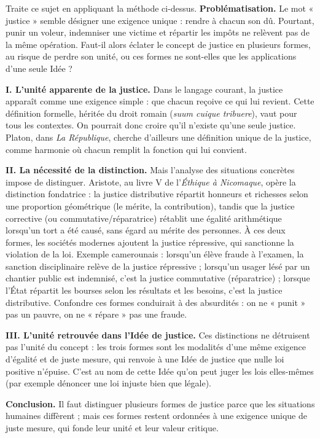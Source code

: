 \documentclass[11pt]{article}
\newcommand{\cle}[1]{{\popxbold\color{popdark}#1}}
\begin{document}
\begin{exoresolu}
Traite ce sujet en appliquant la méthode ci-dessus.
\tcblower
\textbf{Problématisation.} Le mot « justice » semble désigner une exigence unique : rendre à chacun son dû. Pourtant, punir un voleur, indemniser une victime et répartir les impôts ne relèvent pas de la même opération. Faut-il alors éclater le concept de justice en plusieurs formes, au risque de perdre son unité, ou ces formes ne sont-elles que les applications d'une seule Idée ?

\textbf{I. L'unité apparente de la justice.} Dans le langage courant, la justice apparaît comme une exigence simple : que chacun reçoive ce qui lui revient. Cette définition formelle, héritée du droit romain (\emph{suum cuique tribuere}), vaut pour tous les contextes. On pourrait donc croire qu'il n'existe qu'une seule justice. Platon, dans \emph{La République}, cherche d'ailleurs une définition unique de la justice, comme harmonie où chacun remplit la fonction qui lui convient.

\textbf{II. La nécessité de la distinction.} Mais l'analyse des situations concrètes impose de distinguer. Aristote, au livre V de l'\emph{Éthique à Nicomaque}, opère la distinction fondatrice : la \cle{justice distributive} répartit honneurs et richesses selon une proportion géométrique (le mérite, la contribution), tandis que la \cle{justice corrective} (ou commutative/réparatrice) rétablit une égalité arithmétique lorsqu'un tort a été causé, sans égard au mérite des personnes. À ces deux formes, les sociétés modernes ajoutent la \cle{justice répressive}, qui sanctionne la violation de la loi. Exemple camerounais : lorsqu'un élève fraude à l'examen, la sanction disciplinaire relève de la justice répressive ; lorsqu'un usager lésé par un chantier public est indemnisé, c'est la justice commutative (réparatrice) ; lorsque l'État répartit les bourses selon les résultats et les besoins, c'est la justice distributive. Confondre ces formes conduirait à des absurdités : on ne « punit » pas un pauvre, on ne « répare » pas une fraude.

\textbf{III. L'unité retrouvée dans l'Idée de justice.} Ces distinctions ne détruisent pas l'unité du concept : les trois formes sont les modalités d'une même exigence d'égalité et de juste mesure, qui renvoie à une \cle{Idée de justice} que nulle loi positive n'épuise. C'est au nom de cette Idée qu'on peut juger les lois elles-mêmes (par exemple dénoncer une loi injuste bien que légale).

\textbf{Conclusion.} Il faut distinguer plusieurs formes de justice parce que les situations humaines diffèrent ; mais ces formes restent ordonnées à une exigence unique de juste mesure, qui fonde leur unité et leur valeur critique.
\end{exoresolu}
\end{document}

